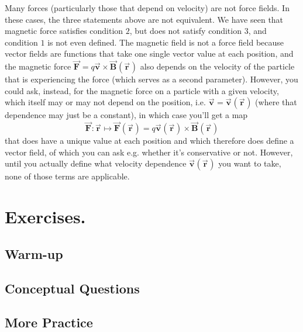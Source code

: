 \documentclass[11pt, letterpaper]{article}
\theoremstyle{definition}
\theoremstyle{remark}
\newcommand{\bv}[2][]{\bm{\vec{#2}_{#1}}}
\begin{document}
Many forces (particularly those that depend on velocity) are not force fields. In these cases, the three statements above are not equivalent. We have seen that magnetic force satisfies condition $2$, but does not satisfy condition $3$, and condition $1$ is not even defined. The magnetic field is not a force field because vector fields are functions that take one single vector value at each position, and the magnetic force $\bv{F} = q\bv{v}\times\bv{B}(\bv{r})$ also depends on the velocity of the particle that is experiencing the force (which serves as a second parameter). However, you could ask, instead, for the magnetic force on a particle with a given velocity, which itself may or may not depend on the position, i.e. $\bv{v} = \bv{v}(\bv{r})$ (where that dependence may just be a constant), in which case you'll get a map \[\bv{F}\colon\bv{r}\mapsto\bv{F}(\bv{r}) = q\bv{v}(\bv{r})\times\bv{B}(\bv{r})\] that does have a unique value at each position and which therefore does define a vector field, of which you can ask e.g. whether it's conservative or not. However, until you actually define what velocity dependence $\bv{v}(\bv{r})$ you want to take, none of those terms are applicable.

\section{Exercises.}
\subsection{Warm-up}
\subsection{Conceptual Questions}
\subsection{More Practice}
\end{document}
